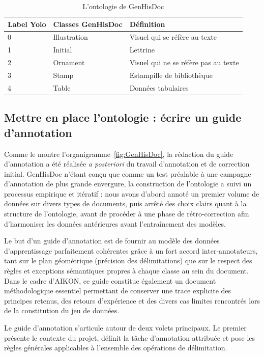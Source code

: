 \begin{table}[h]
    \centering
    \caption{L'ontologie de GenHisDoc}
    \label{tab:segmonto}
    \begin{tabular}{l l l}
        \toprule           
        \textbf{Label Yolo} & \textbf{Classes GenHisDoc} & \textbf{Définition} \\
        \midrule
        0 & Illustration & Visuel qui se réfère au texte \\
        1 & Initial & Lettrine \\
        2 & Ornament &  Visuel qui ne se réfère pas au texte \\
        3 & Stamp & Estampille de bibliothèque \\ 
        4 & Table & Données tabulaires \\
        \bottomrule
    \end{tabular}
\end{table}

\subsection{Mettre en place l'ontologie : écrire un guide d'annotation}

Comme le montre l'organigramme~\ref{fig:GenHisDoc}, la rédaction du guide d'annotation a été réalisée \textit{a posteriori} du travail d'annotation et de correction initial. GenHisDoc n'étant conçu que comme un test préalable à une campagne d'annotation de plus grande envergure, la construction de l'ontologie a suivi un processus empirique et itératif : nous avons d'abord annoté un premier volume de données sur divers types de documents, puis arrêté des choix clairs quant à la structure de l'ontologie, avant de procéder à une phase de rétro-correction afin d'harmoniser les données antérieures avant l'entraînement des modèles.

Le but d'un guide d'annotation est de fournir au modèle des données d'apprentissage parfaitement cohérentes grâce à un fort accord inter-annotateurs, tant sur le plan géométrique (précision des délimitations) que sur le respect des règles et exceptions sémantiques propres à chaque classe au sein du document. Dans le cadre d'AIKON, ce guide constitue également un document méthodologique essentiel permettant de conserver une trace explicite des principes retenus, des retours d'expérience et des divers cas limites rencontrés lors de la constitution du jeu de données.

Le guide d'annotation s'articule autour de deux volets principaux. Le premier présente le contexte du projet, définit la tâche d'annotation attribuée et pose les règles générales applicables à l'ensemble des opérations de délimitation.


